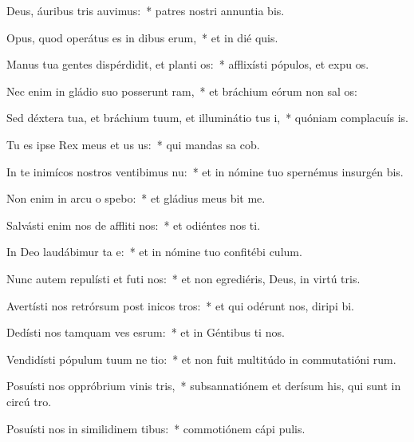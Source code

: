\item Deus, áuribus tris auvimus:~* patres nostri annuntia bis.
\item Opus, quod operátus es in dibus erum,~* et in dié quis.
\item Manus tua gentes dispérdidit, et planti os:~* afflixísti pópulos, et expu os.
\item Nec enim in gládio suo posserunt ram,~* et bráchium eórum non sal os:
\item Sed déxtera tua, et bráchium tuum, et illuminátio tus i,~* quóniam complacuís  is.
\item Tu es ipse Rex meus et us us:~* qui mandas sa cob.
\item In te inimícos nostros ventibimus nu:~* et in nómine tuo spernémus insurgén  bis.
\item Non enim in arcu o spebo:~* et gládius meus  bit me.
\item Salvásti enim nos de affliti nos:~* et odiéntes nos ti.
\item In Deo laudábimur ta e:~* et in nómine tuo confitébi  culum.
\item Nunc autem repulísti et futi nos:~* et non egrediéris, Deus, in virtú tris.
\item Avertísti nos retrórsum post inicos tros:~* et qui odérunt nos, diripi bi.
\item Dedísti nos tamquam ves esrum:~* et in Géntibus ti nos.
\item Vendidísti pópulum tuum ne tio:~* et non fuit multitúdo in commutatióni rum.
\item Posuísti nos oppróbrium vinis tris,~* subsannatiónem et derísum his, qui sunt in circú tro.
\item Posuísti nos in similidinem tibus:~* commotiónem cápi  pulis.
